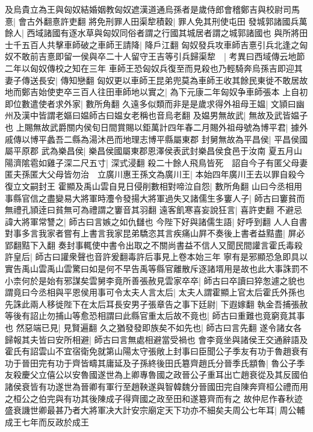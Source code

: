 及烏貴立為王與匈奴結婚姻教匈奴遮漢道通烏孫者是歲侍郎會稽鄭吉與校尉司馬憙|{
	會古外翻憙許吏翻}
將免刑罪人田渠犂積穀|{
	罪人免其刑使屯田}
發城郭諸國兵萬餘人|{
	西域諸國有逐水草與匈奴同俗者謂之行國其城居者謂之城郭諸國也}
與所將田士千五百人共擊車師破之車師王請降|{
	降戶江翻}
匈奴發兵攻車師吉憙引兵北逢之匈奴不敢前吉憙即留一侯與卒二十人留守王吉等引兵歸渠犂　|{
	考異曰西域傳云地節二年以匈奴傳校之知在三年}
車師王恐匈奴兵復至而見殺也乃輕騎奔烏孫吉即迎其妻子傳送長安|{
	傳知戀翻}
匈奴更以車師王昆弟兜莫為車師王收其餘民東徙不敢居故地而鄭吉始使吏卒三百人往田車師地以實之|{
	為下元康二年匈奴争車師張本}
上自初即位數遣使者求外家|{
	數所角翻}
久遠多似類而非是是歲求得外祖母王媪|{
	文頴曰幽州及漢中皆謂老嫗曰媪師古曰媪女老稱也音烏老翻}
及媪男無故武|{
	無故及武皆媪子也}
上賜無故武爵關内侯旬日間賞賜以鉅萬計四年春二月賜外祖母號為博平君|{
	據外戚傳以博平蠡吾二縣為湯沐邑而地理志博平縣屬東郡}
封舅無故為平昌侯|{
	平昌侯國屬平原郡}
武為樂昌侯|{
	樂昌侯國屬東郡恩澤侯表武封樂昌侯食邑于汝南}
夏五月山陽濟隂雹如雞子深二尺五寸|{
	深式浸翻}
殺二十餘人飛鳥皆死　詔自今子有匿父母妻匿夫孫匿大父母皆勿治　立廣川惠王孫文為廣川王|{
	本始四年廣川王去以罪自殺今復立文嗣封王}
霍顯及禹山雲自見日侵削數相對啼泣自怨|{
	數所角翻}
山曰今丞相用事縣官信之盡變易大將軍時灋令發揚大將軍過失又諸儒生多窶人子|{
	師古曰窶貧而無禮孔頴逹曰貧無可為禮謂之窶音其羽翻}
遠客飢寒喜妄說狂言|{
	喜許吏翻}
不避忌諱大將軍常讐之|{
	師古曰言嫉之如仇讎也}
今陛下好與諸儒生語|{
	好呼到翻}
人人自書對事多言我家者嘗有上書言我家昆弟驕恣其言疾痛山屛不奏後上書者益黠盡|{
	屏必郢翻黠下入翻}
奏封事輒使中書令出取之不關尚書益不信人又聞民間讙言霍氏毒殺許皇后|{
	師古曰讙衆聲也音許爰翻毒許后事見上卷本始三年}
寧有是邪顯恐急即具以實告禹山雲禹山雲驚曰如是何不早告禹等縣官離散斥逐諸壻用是故也此大事誅罰不小柰何於是始有邪謀矣雲舅李竟所善張赦見雲家卒卒|{
	師古曰卒讀曰猝怱遽之貌也}
謂竟曰今丞相與平恩侯用事可令太夫人言太后|{
	太夫人謂霍顯上官太后霍氏外孫也}
先誅此兩人移徙陛下在太后耳長安男子張章告之事下廷尉|{
	下遐嫁翻}
執金吾捕張赦等後有詔止勿捕山等愈恐相謂曰此縣官重太后故不竟也|{
	師古曰重難也竟窮竟其事也}
然惡端已見|{
	見賢遍翻}
久之猶發發即族矣不如先也|{
	師古曰言先翻}
遂令諸女各歸報其夫皆曰安所相避|{
	師古曰言無處相避當受禍也}
會李竟坐與諸侯王交通辭語及霍氏有詔雲山不宜宿衛免就第山陽太守張敞上封事曰臣聞公子季友有功于魯趙衰有功于晉田完有功于齊皆疇其庸延及子孫終後田氏簒齊趙氏分晉季氏顓魯|{
	魯公子季友殺慶父立僖公以安魯國遂世為上卿專魯國之政晉公子重耳出亡趙衰從及其反國伯諸侯衰皆有功遂世為晉卿有軍行至趙鞅遂與智韓魏分晉國田完自陳奔齊桓公禮而用之桓公之伯完與有功其後陳成子得齊國之政至田和遂簒齊而有之}
故仲尼作春秋迹盛衰譏世卿最甚乃者大將軍决大計安宗廟定天下功亦不細矣夫周公七年耳|{
	周公輔成王七年而反政於成王}
